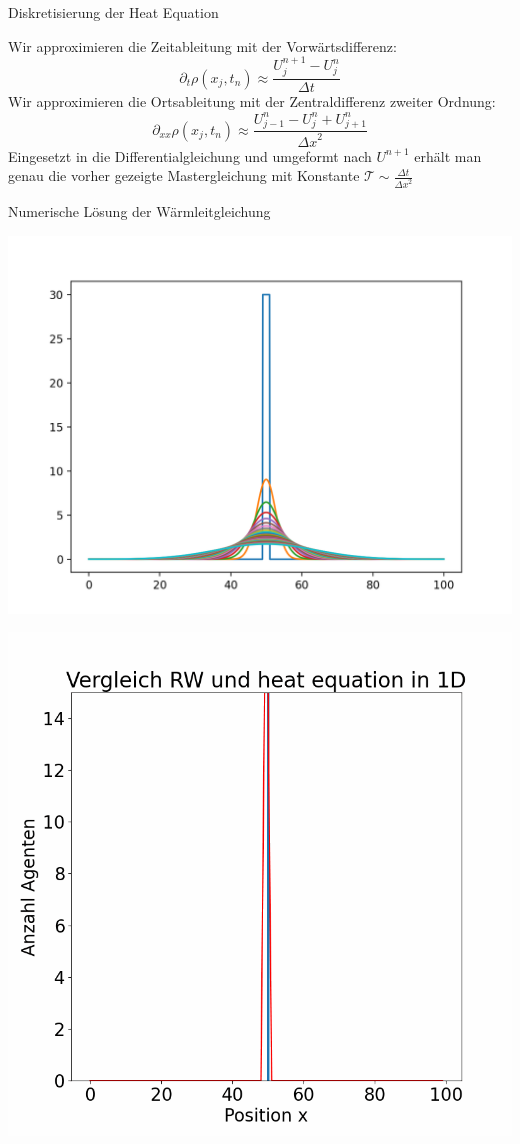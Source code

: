 \documentclass[xcolor=dvipsnames, aspectratio=169]{beamer}
\begin{document}
\begin{frame}[t]{Diskretisierung der Heat Equation}

    Wir approximieren die Zeitableitung mit der Vorwärtsdifferenz: 
    \begin{equation}
        \partial_t \rho(x_j,t_n) \approx  \frac{U^{n+1}_j-U^{n}_j}{\Delta t}
    \end{equation}
    Wir approximieren die Ortsableitung mit der Zentraldifferenz zweiter Ordnung: 
    \begin{equation}
        \partial_{xx} \rho(x_j,t_n) \approx  \frac{U^{n}_{j-1}-U^{n}_j+U^{n}_{j+1}}{{\Delta x}^2}
    \end{equation}
    Eingesetzt in die Differentialgleichung und umgeformt nach $U^{n+1}$ erhält man genau die vorher gezeigte Mastergleichung mit Konstante $\mathcal{T} \sim \frac{\Delta t}{{\Delta x}^2}$  
     
\end{frame}
\begin{frame}{Numerische Lösung der Wärmleitgleichung}
    \begin{center}
        \includegraphics[width=0.7\linewidth]{figures/Heat1Dadjustiert.png} 
    \end{center}
\end{frame}

\begin{frame}
\begin{center}
\includegraphics[width=0.45\linewidth]{figures/VergleichRW_Heat/VergleichRW_Heat-0.png} 
\end{center}
\end{frame}
\end{document}
